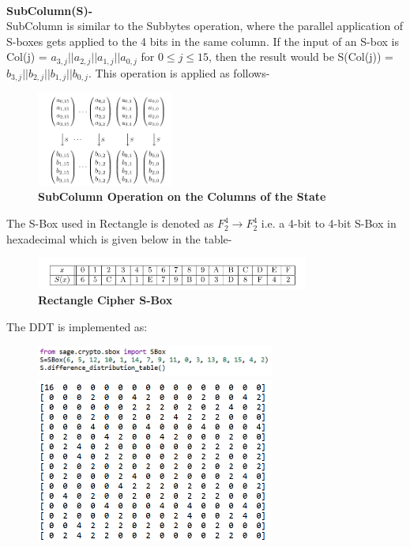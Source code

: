 \documentclass[journal=tosc,preprint]{iacrtrans}
\begin{document}
\\
\textbf{ SubColumn(S)-}\\
SubColumn is similar to the Subbytes operation, where the parallel application of S-boxes gets applied to the 4 bits in the same column. If the input of an S-box is Col(j) = $a_{3,j} || a_{2,j} || a_{1,j} || a_{0,j}$ for $0 \leq j \leq 15$, then the result would be S(Col(j)) = $b_{3,j} || b_{2,j} || b_{1,j} || b_{0,j}$. This operation is applied as follows-\\
\begin{figure}[H]
    \centering
    \includegraphics[width=0.4\textwidth]{Screenshot 2024-11-30 133419.png}
    \caption*{ \textbf{SubColumn Operation on the Columns of the State}}
\end{figure}

\hspace{0pt}The S-Box used in Rectangle is denoted as $F_{2}^{4} \xrightarrow{} F_{2}^{4}$  i.e. a 4-bit to 4-bit S-Box in hexadecimal which is given below in the table-
\begin{figure}[H]
    \centering
    \includegraphics[width=0.8\textwidth]{Screenshot 2024-11-30 134956.png}
    \caption*{ \textbf{Rectangle Cipher S-Box}}
\end{figure}
The DDT is implemented as:
\begin{figure}[H]
    \centering
    \includegraphics[width=0.7\textwidth]{Screenshot 2024-11-30 141729.png}
    \includegraphics[width=0.7\textwidth]{Screenshot 2024-11-30 141742.png}
\end{figure}
\end{document}
